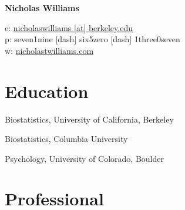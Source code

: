 \documentclass[12pt,letterpaper]{report}
\newcommand{\myname}{Nicholas Williams}
\newcommand{\namefont}[1]{{\normalfont\bfseries\Huge{#1}}}
\begin{document}
    \raggedright

    \namefont{\myname}

    \vspace{1em}
    \begin{minipage}[t]{0.64\textwidth}
        e: \href{mailto:nicholaswilliams@berkeley.edu}{{nicholaswilliams [at] berkeley.edu}} \\
        p: seven1nine [dash] six5zero [dash] 1three0seven \\
        w: \href{https://nicholastwilliams.com/}{nicholastwilliams.com}
    \end{minipage}
    \begin{minipage}[t]{0.34\textwidth}
    \end{minipage}
    \vspace{0.5em}

    \section*{Education}

    \begin{tablist}
    
    	\item[Ph.D.]  \tab Biostatistics, University of California, Berkeley

        \item[M.P.H.]   \tab Biostatistics, Columbia University

        \item[B.A.]   \tab Psychology, University of Colorado, Boulder

    \end{tablist}

    \section*{Professional}
    
\end{document}
